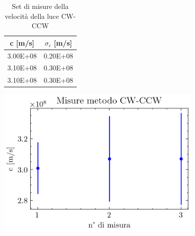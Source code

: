 \documentclass{article}
\begin{document}
            \begin{table}[H]
                
                \centering
                \begin{minipage}{0.35\linewidth}

                    \centering
                    \begin{tabular}{ c c }
                        
                        \toprule
                        c [m/s] &  $\sigma_c$ [m/s] \\
                        
                        \midrule
                        3.00E+08 & 0.20E+08  \\
                        3.10E+08 & 0.30E+08  \\ 
                        3.10E+08 & 0.30E+08  \\
                        \bottomrule 

                    \end{tabular}

                    \caption{Set di misure della velocità della luce CW-CCW}

                \end{minipage}
                \begin{minipage}{0.6\linewidth}

                    \centering
                    \includegraphics[width=10cm]{../images/CW_CCW.png}


                \end{minipage}

            \end{table}
\end{document}
